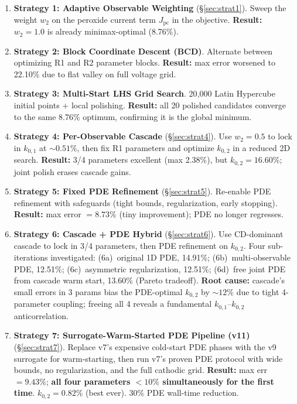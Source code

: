 \documentclass[11pt]{article}
\begin{document}
\begin{enumerate}
  \item \textbf{Strategy 1: Adaptive Observable Weighting} (\S\ref{sec:strat1}).
        Sweep the weight $w_2$ on the peroxide current term $J_{\text{pc}}$
        in the objective.  \textbf{Result:} $w_2 = 1.0$ is already
        minimax-optimal (8.76\%).

  \item \textbf{Strategy 2: Block Coordinate Descent (BCD)}.
        Alternate between optimizing R1 and R2 parameter blocks.
        \textbf{Result:} max error worsened to 22.10\% due to flat valley on
        full voltage grid.

  \item \textbf{Strategy 3: Multi-Start LHS Grid Search}.
        20{,}000 Latin Hypercube initial points + local polishing.
        \textbf{Result:} all 20 polished candidates converge to the same
        8.76\% optimum, confirming it is the global minimum.

  \item \textbf{Strategy 4: Per-Observable Cascade} (\S\ref{sec:strat4}).
        Use $w_2 = 0.5$ to lock in $k_{0,1}$ at ${\sim}0.51\%$, then fix R1
        parameters and optimize $k_{0,2}$ in a reduced 2D search.
        \textbf{Result:} 3/4 parameters excellent (max 2.38\%), but
        $k_{0,2} = 16.60\%$; joint polish erases cascade gains.

  \item \textbf{Strategy 5: Fixed PDE Refinement} (\S\ref{sec:strat5}).
        Re-enable PDE refinement with safeguards (tight bounds, regularization,
        early stopping).
        \textbf{Result:} max error $= 8.73\%$ (tiny improvement); PDE no
        longer regresses.

  \item \textbf{Strategy 6: Cascade + PDE Hybrid} (\S\ref{sec:strat6}).
        Use CD-dominant cascade to lock in 3/4 parameters, then PDE
        refinement on $k_{0,2}$.  Four sub-iterations investigated:
        (6a)~original 1D PDE, 14.91\%;
        (6b)~multi-observable PDE, 12.51\%;
        (6c)~asymmetric regularization, 12.51\%;
        (6d)~free joint PDE from cascade warm start, 13.60\% (Pareto tradeoff).
        \textbf{Root cause:} cascade's small errors in 3 params bias the
        PDE-optimal $k_{0,2}$ by ${\sim}12\%$ due to tight 4-parameter coupling;
        freeing all 4 reveals a fundamental $k_{0,1}$--$k_{0,2}$ anticorrelation.

  \item \textbf{Strategy 7: Surrogate-Warm-Started PDE Pipeline (v11)}
        (\S\ref{sec:strat7}).
        Replace v7's expensive cold-start PDE phases with the v9 surrogate
        for warm-starting, then run v7's proven PDE protocol with wide bounds,
        no regularization, and the full cathodic grid.
        \textbf{Result:} max err $= 9.43\%$; \textbf{all four parameters
        $< 10\%$ simultaneously for the first time}.  $k_{0,2} = 0.82\%$
        (best ever).  30\% PDE wall-time reduction.
\end{enumerate}
\end{document}
